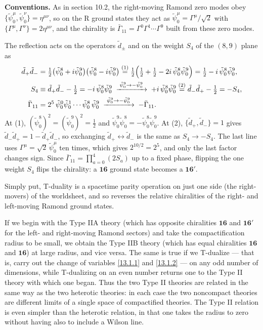 \begin{tcolorbox}[breakable]
	\begin{remark}
		\textbf{Conventions.} As in section 10.2, the right-moving Ramond zero modes obey $\{\tilde\psi^\mu_0,\tilde\psi^\nu_0\}=\eta^{\mu\nu}$, so on the R ground states they act as $\tilde\psi^\mu_0=\Gamma^\mu/\sqrt2$ with $\{\Gamma^\mu,\Gamma^\nu\}=2\eta^{\mu\nu}$, and the chirality is $\bar\Gamma_{11}=\Gamma^0\Gamma^1\cdots\Gamma^9$ built from these zero modes.

		The reflection acts on the operators $\tilde d_\pm$ and on the weight $S_4$ of the $(8,9)$ plane as
		\begin{align*}
			\tilde d_+\tilde d_- &= \tfrac12\bigl(\tilde\psi^8_0+i\tilde\psi^9_0\bigr)\bigl(\tilde\psi^8_0-i\tilde\psi^9_0\bigr)
			\overset{(1)}{=} \tfrac12\Bigl(\tfrac12+\tfrac12-2i\,\tilde\psi^8_0\tilde\psi^9_0\Bigr)
			= \tfrac12-i\,\tilde\psi^8_0\tilde\psi^9_0 ,\\
			S_4 &\equiv \tilde d_+\tilde d_- -\tfrac12 = -i\,\tilde\psi^8_0\tilde\psi^9_0
			\;\xrightarrow{\;\tilde\psi^9_0\to-\tilde\psi^9_0\;}\; +i\,\tilde\psi^8_0\tilde\psi^9_0 \overset{(2)}{=} \tilde d_-\tilde d_+-\tfrac12 = -S_4 ,\\
			\bar\Gamma_{11} &= 2^5\,\tilde\psi^0_0\tilde\psi^1_0\cdots\tilde\psi^8_0\,\tilde\psi^9_0
			\;\xrightarrow{\;\tilde\psi^9_0\to-\tilde\psi^9_0\;}\; -\bar\Gamma_{11} .
		\end{align*}
		At (1), $(\tilde\psi^8_0)^2=(\tilde\psi^9_0)^2=\tfrac12$ and $\tilde\psi^9_0\tilde\psi^8_0=-\tilde\psi^8_0\tilde\psi^9_0$. At (2), $\{\tilde d_+,\tilde d_-\}=1$ gives $\tilde d_-\tilde d_+ = 1-\tilde d_+\tilde d_-$, so exchanging $\tilde d_+\leftrightarrow\tilde d_-$ is the same as $S_4\to-S_4$. The last line uses $\Gamma^\mu=\sqrt2\,\tilde\psi^\mu_0$ ten times, which gives $2^{10/2}=2^5$, and only the last factor changes sign. Since $\bar\Gamma_{11}=\prod_{a=0}^4(2S_a)$ up to a fixed phase, flipping the one weight $S_4$ flips the chirality: a $\mathbf{16}$ ground state becomes a $\mathbf{16}'$.
	\end{remark}
\end{tcolorbox}
Simply put, T-duality is a spacetime parity operation on just one side (the right-movers) of the worldsheet, and so reverses the relative chiralities of the right- and left-moving Ramond ground states.

If we begin with the Type IIA theory (which has opposite chiralities $\mathbf{16}$ and $\mathbf{16}'$ for the left- and right-moving Ramond sectors) and take the compactification radius to be small, we obtain the Type IIB theory (which has equal chiralities $\mathbf{16}$ and $\mathbf{16}$) at large radius, and vice versa. The same is true if we T-dualize --- that is, carry out the change of variables \eqref{13.1.1} and \eqref{13.1.2} --- on any odd number of dimensions, while T-dualizing on an even number returns one to the Type II theory with which one began. Thus the two Type II theories are related in the same way as the two heterotic theories: in each case the two noncompact theories are different limits of a single space of compactified theories. The Type II relation is even simpler than the heterotic relation, in that one takes the radius to zero without having also to include a Wilson line.


